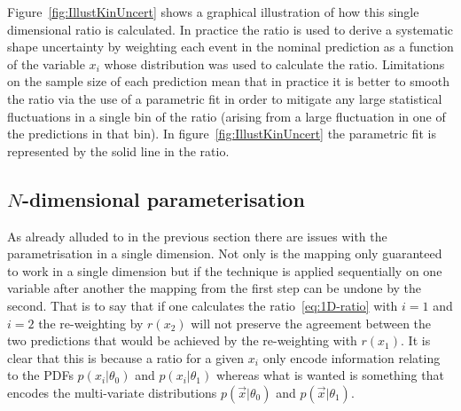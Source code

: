 Figure~\ref{fig:IllustKinUncert} shows a graphical illustration of how this
single dimensional ratio is calculated. In practice the ratio is used to derive
a systematic shape uncertainty by weighting each event in the nominal
prediction as a function of the variable $x_{i}$ whose distribution was used to
calculate the ratio. Limitations on the sample size of each prediction mean that
in practice it is better to smooth the ratio via the use of a parametric fit in
order to mitigate any large statistical fluctuations in a single bin of the
ratio (arising from a large fluctuation in one of the predictions in that bin).
In figure~\ref{fig:IllustKinUncert} the parametric fit is represented by the
solid line in the ratio.



\subsection{$N$-dimensional parameterisation}
\label{sec:ND-reweight}

As already alluded to in the previous section there are issues with the
parametrisation in a single dimension. Not only is the mapping only guaranteed
to work in a single dimension but if the technique is applied sequentially on
one variable after another the mapping from the first step can be undone by the
second. That is to say that if one calculates the ratio~\ref{eq:1D-ratio} with
$i=1$ and $i=2$ the re-weighting by $r(x_2)$ will not preserve the agreement
between the two predictions that would be achieved by the re-weighting with
$r(x_1)$. It is clear that this is because a ratio for a given $x_i$ only encode
information relating to the PDFs $p(x_i|\theta_0)$ and $p(x_i|\theta_1)$ whereas
what is wanted is something that encodes the multi-variate distributions
$p(\vec{x}|\theta_0)$ and $p(\vec{x}|\theta_1)$.

